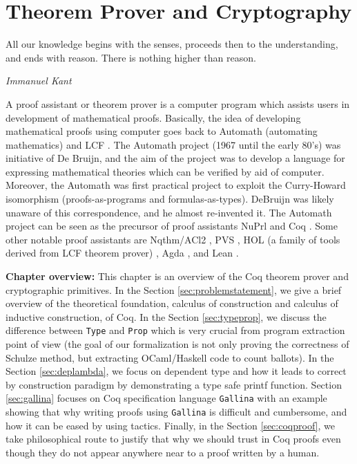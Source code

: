 \chapter{Theorem Prover and Cryptography}
\label{cha:theorem_crypto}
 \setlength{\parindent}{2em}
\setlength{\parskip}{1em}

\epigraph{All our knowledge begins with the senses, proceeds then to the understanding, and
 ends with reason. There is nothing higher than reason.} 
{\textit{Immanuel Kant}} 

A proof assistant or theorem prover is a computer program which assists users in development 
of mathematical proofs. Basically, the idea of 
developing mathematical proofs using computer goes back to Automath (automating mathematics)
\citep{deBruijn1983} and LCF \citep{Milner:1972:IAS:942578.807067}. The 
Automath project (1967 until the early 80's)  was initiative of De Bruijn, and the aim of the project was to 
develop a language for expressing mathematical theories which can be verified by aid of computer.  
Moreover, the Automath was first 
practical project to exploit the Curry-Howard isomorphism (proofs-as-programs and formulas-as-types). 
DeBruijn  was likely unaware of this correspondence, and he almost re-invented it.
The Automath project can be seen as the precursor of
 proof assistants NuPrl \citep{Constable:1986:IMN:10510} and Coq \citep{Bertot:2004:ITP}.  
 Some other notable  proof assistants are 
 Nqthm/ACl2 \citep{507872}, PVS \citep{Owre:1992:PPV:648230.752639},
 HOL (a family of tools derived from LCF theorem prover) \citep{Slind:2008:BOH:1459784.1459792}
 \citep{Harrison:1996:HLT:646184.682934} \citep{Nipkow:2002:IHP},
 Agda \citep{Norell:2008:DTP:1813347.1813352}, and Lean \citep{10.1007/978-3-319-21401-6_26}.


\textbf{Chapter overview:}
 This chapter is an overview of the Coq theorem prover and cryptographic primitives. 
 In the Section \ref{sec:problemstatement}, we give a brief overview of 
 the theoretical foundation, calculus of construction and calculus of inductive 
 construction, of Coq.  In the Section \ref{sec:typeprop}, we discuss
 the difference between \texttt{Type} and \texttt{Prop}
 which is very crucial from program extraction point of view (the goal of 
 our formalization is  not only proving the correctness of 
 Schulze method, but extracting  OCaml/Haskell code to count 
 ballots).  In the Section \ref{sec:deplambda}, we focus 
 on dependent type and  how it leads to correct by construction paradigm
 by demonstrating a  type safe printf function. 
 Section \ref{sec:gallina} focuses on Coq specification language 
 \texttt{Gallina} with an example showing that why writing proofs using  
 \texttt{Gallina} is difficult and cumbersome, and how it can be eased by 
 using tactics. Finally, in the Section  \ref{sec:coqproof}, we take 
 philosophical route to justify that why we should trust in Coq proofs 
 even though they do not appear anywhere near to a proof written by 
 a human.  
 

